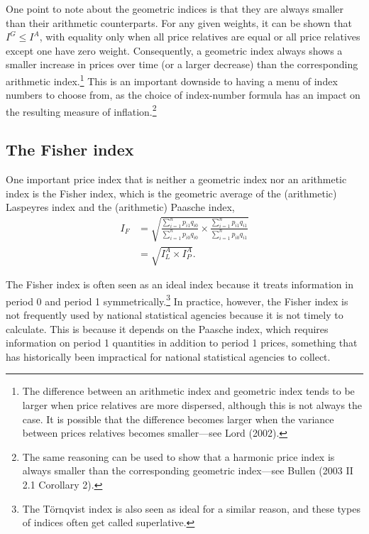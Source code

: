 \documentclass[]{article}
\begin{document}
One point to note about the geometric indices is that they are always smaller than their arithmetic counterparts. For any given weights, it can be shown that \(I^{G} \leq I^{A}\), with equality only when all price relatives are equal or all price relatives except one have zero weight. Consequently, a geometric index always shows a smaller increase in prices over time (or a larger decrease) than the corresponding arithmetic index.\footnote{The difference between an arithmetic index and geometric index tends to be larger when price relatives are more dispersed, although this is not always the case. It is possible that the difference becomes larger when the variance between prices relatives becomes smaller---see Lord (2002).} This is an important downside to having a menu of index numbers to choose from, as the choice of index-number formula has an impact on the resulting measure of inflation.\footnote{The same reasoning can be used to show that a harmonic price index is always smaller than the corresponding geometric index---see Bullen (2003 II 2.1 Corollary 2).}

\hypertarget{the-fisher-index}{%
\subsection{The Fisher index}\label{the-fisher-index}}

One important price index that is neither a geometric index nor an arithmetic index is the Fisher index, which is the geometric average of the (arithmetic) Laspeyres index and the (arithmetic) Paasche index,
\begin{align*}
I_{F} &= \sqrt{\frac{\sum_{i = 1}^{n} p_{i1} q_{i0}}{\sum_{i = 1}^{n} p_{i0} q_{i0}} \times \frac{\sum_{i = 1}^{n} p_{i1} q_{i1}}{\sum_{i = 1}^{n} p_{i0} q_{i1}}} \\
&= \sqrt{I^{A}_{L} \times I^{A}_{P}}.
\end{align*}

The Fisher index is often seen as an ideal index because it treats information in period 0 and period 1 symmetrically.\footnote{The Törnqvist index is also seen as ideal for a similar reason, and these types of indices often get called superlative.} In practice, however, the Fisher index is not frequently used by national statistical agencies because it is not timely to calculate. This is because it depends on the Paasche index, which requires information on period 1 quantities in addition to period 1 prices, something that has historically been impractical for national statistical agencies to collect.
\end{document}

